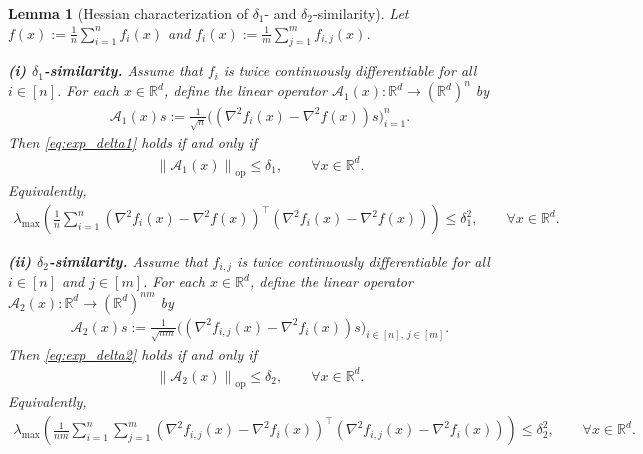 \documentclass{article}
\newcommand{\bb}{\mathbb}
\newcommand{\op}{\operatorname{op}}
\newcommand{\R}{\bb R}
\newcommand{\opnorm}[1]{\left\| #1 \right\|_{\op}}      %
\newcommand{\eqdef}{:=}
\newcommand{\rb}[1]{\left(#1\right)}
\theoremstyle{plain}
\newtheorem{lemma}{Lemma}
\begin{document}
\begin{lemma}[Hessian characterization of $\delta_1$- and $\delta_2$-similarity]
\label{lem:hessian_characterization_delta}
Let $f(x)\eqdef \frac{1}{n}\sum_{i=1}^n f_i(x)$ and
$f_i(x)\eqdef \frac{1}{m}\sum_{j=1}^m f_{i,j}(x)$.

\smallskip
\noindent
\textbf{(i) $\delta_1$-similarity.}
Assume that $f_i$ is twice continuously differentiable for all $i\in[n]$.
For each $x\in\R^d$, define the linear operator
$\mathcal{A}_1(x):\R^d\to(\R^d)^n$ by
\begin{align}
    \mathcal{A}_1(x)s
    \eqdef
    \frac{1}{\sqrt n}
    \big(
    (\nabla^2 f_i(x)-\nabla^2 f(x))s
    \big)_{i=1}^n .
    \label{eq:A1_definition}
\end{align}
Then \eqref{eq:exp_delta1} holds if and only if
\begin{align}
    \opnorm{\mathcal{A}_1(x)}\le \delta_1,
    \qquad
    \forall x\in\R^d .
    \label{eq:hess_delta1_stacked_opnorm}
\end{align}
Equivalently,
\begin{align}
    \lambda_{\max}\rb{
    \frac1n\sum_{i=1}^n
    \rb{\nabla^2 f_i(x)-\nabla^2 f(x)}^\top
    \rb{\nabla^2 f_i(x)-\nabla^2 f(x)}
    }
    \le \delta_1^2,
    \qquad
    \forall x\in\R^d .
    \label{eq:hess_delta1_spectral}
\end{align}

\smallskip
\noindent
\textbf{(ii) $\delta_2$-similarity.}
Assume that $f_{i,j}$ is twice continuously differentiable for all
$i\in[n]$ and $j\in[m]$.
For each $x\in\R^d$, define the linear operator
$\mathcal{A}_2(x):\R^d\to(\R^d)^{nm}$ by
\begin{align}
    \mathcal{A}_2(x)s
    \eqdef
    \frac{1}{\sqrt{nm}}
    \big(
    (\nabla^2 f_{i,j}(x)-\nabla^2 f_i(x))s
    \big)_{i\in[n],\,j\in[m]} .
    \label{eq:A2_definition}
\end{align}
Then \eqref{eq:exp_delta2} holds if and only if
\begin{align}
    \opnorm{\mathcal{A}_2(x)}\le \delta_2,
    \qquad
    \forall x\in\R^d .
    \label{eq:hess_delta2_stacked_opnorm}
\end{align}
Equivalently,
\begin{align}
    \lambda_{\max}\rb{
    \frac1{nm}\sum_{i=1}^n\sum_{j=1}^m
    \rb{\nabla^2 f_{i,j}(x)-\nabla^2 f_i(x)}^\top
    \rb{\nabla^2 f_{i,j}(x)-\nabla^2 f_i(x)}
    }
    \le \delta_2^2,
    \qquad
    \forall x\in\R^d .
    \label{eq:hess_delta2_spectral}
\end{align}
\end{lemma}
\end{document}
